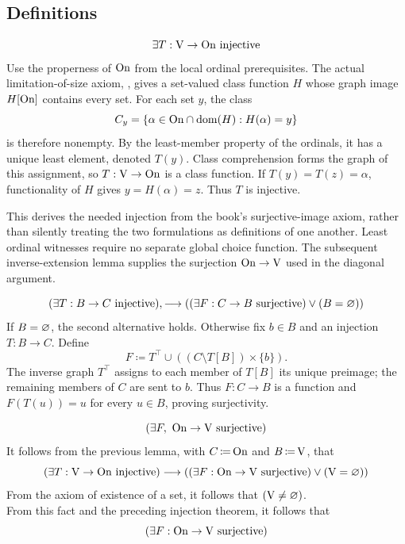 \subsection{Definitions}


\begin{theorem}
\[
\exists T: \mathrm{V} \to \mathrm{On} \text{ injective}
\]
\Proof
Use the properness of $\mathrm{On}$ from the local ordinal prerequisites.
The actual limitation-of-size axiom, ,
gives a set-valued class function $H$ whose graph image $H[\mathrm{On}]$
contains every set. For each set $y$, the class
\[
C_y=\{\alpha\in\mathrm{On}\cap\mathrm{dom}(H):H(\alpha)=y\}
\]
is therefore nonempty. By the least-member property of the ordinals,
it has a unique least element, denoted $T(y)$. Class comprehension
forms the graph of this assignment, so $T:\mathrm{V}\to\mathrm{On}$ is a class
function. If $T(y)=T(z)=\alpha$, functionality of $H$ gives
$y=H(\alpha)=z$. Thus $T$ is injective.

This derives the needed injection from the book's surjective-image
axiom, rather than silently treating the two formulations as definitions
of one another. Least ordinal witnesses require no separate global
choice function. The subsequent inverse-extension lemma supplies the
surjection $\mathrm{On}\to\mathrm{V}$ used in the diagonal argument.
\Done
\end{theorem}

\begin{lemma}
\[
(\exists T: B \to C \text{ injective}),
\longrightarrow
(
(\exists F: C \to B \text{ surjective})
\lor
(B=\varnothing)
)
\]
\Proof
If $B=\varnothing$, the second alternative holds. Otherwise fix $b\in B$
and an injection $T:B\to C$. Define
\[
F\coloneqq T^\top\cup((C\setminus T[B])\times\{b\}).
\]
The inverse graph $T^\top$ assigns to each member of $T[B]$ its unique
preimage; the remaining members of $C$ are sent to $b$. Thus $F:C\to B$
is a function and $F(T(u))=u$ for every $u\in B$, proving surjectivity.
\Done
\end{lemma}

\begin{lemma}
\label{lem:exOnToVSurj}
\[
(\exists F,\ \mathrm{On} \to \mathrm{V} \text{ surjective})
\]
\Proof
It follows from the previous lemma, with $C\,{\coloneqq}\,\mathrm{On}$ and
$B\,{\coloneqq}\,\mathrm{V}$, that
\[
(\exists T: \mathrm{V} \to \mathrm{On} \text{ injective})
\longrightarrow
(
(\exists F:\mathrm{On}\to \mathrm{V}\text{ surjective})
\lor
(\mathrm{V}=\varnothing)
)
\]
From the axiom of existence of a set, it follows that $(\mathrm{V}\neq\varnothing)$.\\
From this fact and the preceding injection theorem, it follows that
\[
(\exists F:\mathrm{On}\to \mathrm{V}\text{ surjective})
\]
\Done
\end{lemma}


